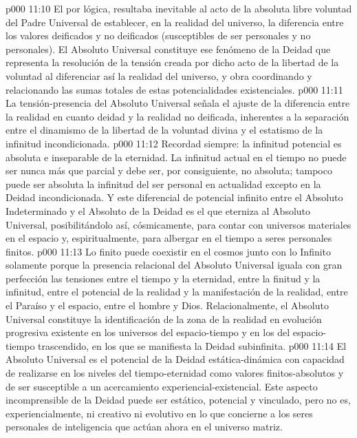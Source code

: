 \vs p000 11:10 El  por lógica, resultaba inevitable al acto de la absoluta libre voluntad del Padre Universal de establecer, en la realidad del universo, la diferencia entre los valores deificados y no deificados (susceptibles de ser personales y no personales). El Absoluto Universal constituye ese fenómeno de la Deidad que representa la resolución de la tensión creada por dicho acto de la libertad de la voluntad al diferenciar así la realidad del universo, y obra coordinando y relacionando las sumas totales de estas potencialidades existenciales.
\vs p000 11:11 \pc La tensión\hyp{}presencia del Absoluto Universal señala el ajuste de la diferencia entre la realidad en cuanto deidad y la realidad no deificada, inherentes a la separación entre el dinamismo de la libertad de la voluntad divina y el estatismo de la infinitud incondicionada.
\vs p000 11:12 \pc Recordad siempre: la infinitud potencial es absoluta e inseparable de la eternidad. La infinitud actual en el tiempo no puede ser nunca más que parcial y debe ser, por consiguiente, no absoluta; tampoco puede ser absoluta la infinitud del ser personal en actualidad excepto en la Deidad incondicionada. Y este diferencial de potencial infinito entre el Absoluto Indeterminado y el Absoluto de la Deidad es el que eterniza al Absoluto Universal, posibilitándolo así, cósmicamente, para contar con universos materiales en el espacio y, espiritualmente, para albergar en el tiempo a seres personales finitos.
\vs p000 11:13 Lo finito puede coexistir en el cosmos junto con lo Infinito solamente porque la presencia relacional del Absoluto Universal iguala con gran perfección las tensiones entre el tiempo y la eternidad, entre la finitud y la infinitud, entre el potencial de la realidad y la manifestación de la realidad, entre el Paraíso y el espacio, entre el hombre y Dios. Relacionalmente, el Absoluto Universal constituye la identificación de la zona de la realidad en evolución progresiva existente en los universos del espacio\hyp{}tiempo y en los del espacio\hyp{}tiempo trascendido, en los que se manifiesta la Deidad subinfinita.
\vs p000 11:14 El Absoluto Universal es el potencial de la Deidad estática\hyp{}dinámica con capacidad de realizarse en los niveles del tiempo\hyp{}eternidad como valores finitos\hyp{}absolutos y de ser susceptible a un acercamiento experiencial\hyp{}existencial. Este aspecto incomprensible de la Deidad puede ser estático, potencial y vinculado, pero no es, experiencialmente, ni creativo ni evolutivo en lo que concierne a los seres personales de inteligencia que actúan ahora en el universo matriz.
